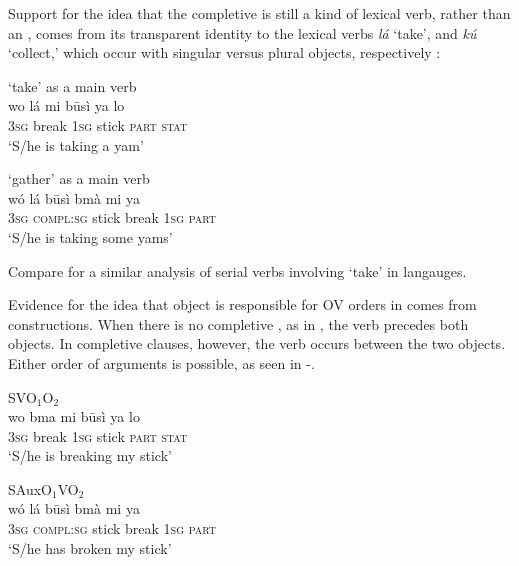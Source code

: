 \documentclass[output=paper]{LSP/langsci}
\begin{document}
Support for the idea that the completive is still a kind of lexical verb, rather than an , comes from its transparent identity to the lexical verbs \textit{l\'a} `take', and \textit{k\'u} `collect,' which occur with singular versus plural objects, respectively \citep[63]{hyman1970}:

\ea \label{ex:Gwari-takecollect}

\ea \label{ex:Gwari-take} { `take' as a main verb}	\\
\gll wo l\'a mi b\={u}s\`{i} ya lo \\
3\textsc{sg} break 1\textsc{sg} stick \textsc{part} \textsc{stat} \\
\glt `S/he is taking a yam' \hfill \citep[][92]{hyman1970}

\ex \label{ex:Gwari-gather} { `gather' as a main verb}	\\
\gll w\'o l\'a  b\={u}s\`{i} bm\`a mi ya \\
3\textsc{sg} \textsc{compl:sg} stick break 1\textsc{sg} \textsc{part}  \\
\glt `S/he is taking some yams' \hfill \citep[][93]{hyman1970}

\z
\z
Compare \citet{aboh09} for a similar analysis of serial verbs involving `take' in  langauges.

Evidence for the idea that object  is responsible for OV orders in  comes from  constructions. When there is no completive , as in , the verb precedes both objects. In completive clauses, however, the verb occurs between the two objects. Either order of arguments is possible, as seen in -. 

\ea \label{ex:Gwari-DOC}

\ea \label{ex:Gwari-DOC-VOO} {SVO$_1$O$_2$}	\\
\gll wo bma mi b\={u}s\`{i} ya lo \\
3\textsc{sg} break 1\textsc{sg} stick \textsc{part} \textsc{stat} \\
\glt `S/he is breaking my stick' \hfill \citep[][92]{hyman1970}

\ex \label{ex:Gwari-DOC-O1VO2} {SAuxO$_1$VO$_2$}	\\
\gll w\'o l\'a  b\={u}s\`{i} bm\`a mi ya \\
3\textsc{sg} \textsc{compl:sg} stick break 1\textsc{sg} \textsc{part}  \\
\glt `S/he has broken my stick' \hfill \citep[][93]{hyman1970}
\end{document}
